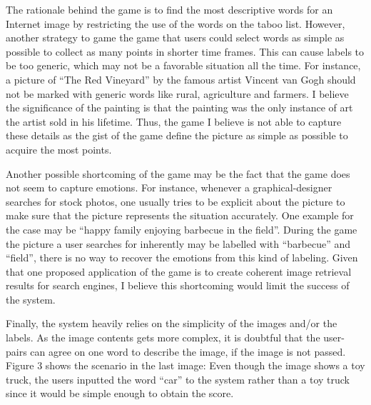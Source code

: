 \documentclass[11pt]{article}
\begin{document}


The rationale behind the game is to find the most descriptive words for an Internet image by restricting the use of the words on the taboo list.
However, another strategy to game the game that users could select words as simple as possible to collect as many points in shorter time frames.
This can cause labels to be too generic, which may not be a favorable situation all the time.
For instance, a picture of ``The Red Vineyard'' by the famous artist Vincent van Gogh should not be marked with generic words like rural, agriculture and farmers.
I believe the significance of the painting is that the painting was the only instance of art the artist sold in his lifetime.
Thus, the game I believe is not able to capture these details as the gist of the game define the picture as simple as possible to acquire the most points.

Another possible shortcoming of the game may be the fact that the game does not seem to capture emotions.
For instance, whenever a graphical-designer searches for stock photos, one usually tries to be explicit about the picture to make sure that the picture represents the situation accurately.
One example for the case may be ``happy family enjoying barbecue in the field''.
During the game the picture a user searches for inherently may be labelled with ``barbecue'' and ``field'', there is no way to recover the emotions from this kind of labeling.
Given that one proposed application of the game is to create coherent image retrieval results for search engines, I believe this shortcoming would limit the success of the system.

Finally, the system heavily relies on the simplicity of the images and/or the labels.
As the image contents gets more complex, it is doubtful that the user-pairs can agree on one word to describe the image, if the image is not passed.
Figure 3 shows the scenario in the last image: Even though the image shows a toy truck, the users inputted the word ``car'' to the system rather than a toy truck since it would be simple enough to obtain the score.

% 
% 
\end{document}
